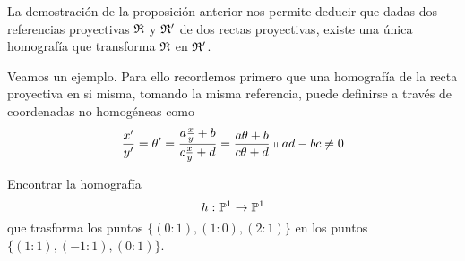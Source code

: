 \begin{obs}
	La demostración de la proposición anterior nos permite deducir que dadas dos referencias proyectivas $\mathfrak{R}$ y $\mathfrak{R'}$ de dos rectas proyectivas, existe una única homografía que transforma $\mathfrak{R}$ en $\mathfrak{R'}$.
\end{obs}
Veamos un ejemplo. Para ello recordemos primero que una homografía de la recta proyectiva en si misma, tomando la misma referencia,  puede definirse a través de coordenadas no homogéneas como
\begin{equation}
	\label{C5_eq_homografia_nohom}
	\frac{x'}{y'}=\theta'=\frac{a\frac{x}{y}+b}{c\frac{x}{y}+d}=\frac{a\theta+b}{c\theta +d}\shortparallel ad-bc\not=0
\end{equation}
\begin{exa}
	Encontrar la homografía 
	\[h:\mathbb{P}^1\rightarrow \mathbb{P}^1\] 
	que trasforma los puntos $\{(0:1),(1:0),(2:1)\}$ en los puntos $\{(1:1),(-1:1),(0:1)\}$.\\
	

\end{exa}
